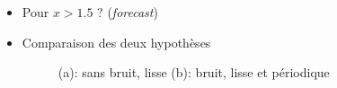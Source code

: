 \documentclass[xcolor=svgnames, t]{beamer}
\newcommand{\coloredemph}[1]{\textcolor{internationalblue}{\emph{#1}}}
\begin{document}
\begin{frame}{\subsecname}
  \begin{itemize}
    \item<1-> Pour $x > 1.5$ ? (\coloredemph{forecast})
    \item<2-> Comparaison des deux hypothèses
      \begin{figure}
        \centering
        \caption{(a): sans bruit, lisse (b): bruit, lisse et périodique}
      \end{figure}
  \end{itemize}
\end{frame}

\end{document}
